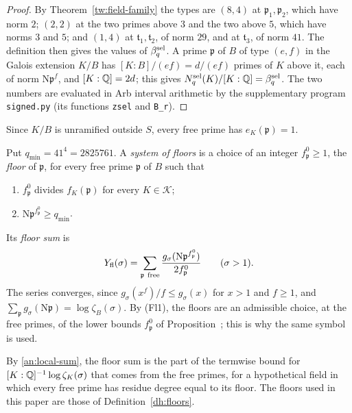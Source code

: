 \begin{proof}
By Theorem~\ref{tw:field-family} the types are $(8,4)$ at
$\mathfrak p_1,\mathfrak p_2$, which have norm $2$; $(2,2)$ at the two primes
above $3$ and the two above $5$, which have norms $3$ and $5$; and $(1,4)$ at
$\mathfrak t_1,\mathfrak t_2$, of norm $29$, and at $\mathfrak t_3$, of norm
$41$. The definition then gives the values of $\beta^{\rm sel}_q$. A prime
$\mathfrak p$ of $B$ of type $(e,f)$ in the Galois extension $K/B$ has
$[K:B]/(ef)=d/(ef)$ primes of $K$ above it, each of norm
$\mathrm N\mathfrak p^f$, and $[K:\mathbb Q]=2d$; this gives
$N^{\rm sel}_q(K)/[K:\mathbb Q]=\beta^{\rm sel}_q$. The two numbers are evaluated
in Arb interval arithmetic by the supplementary program \texttt{signed.py}
(its functions \texttt{zsel} and \texttt{B\_r}).
\end{proof}

Since $K/B$ is unramified outside $S$, every free prime has $e_K(\mathfrak
p)=1$.

\begin{definition}\label{an:floor-def}
Put $q_{\min}=41^4=2825761$. A \emph{system of floors} is a choice of an
integer $f^0_{\mathfrak p}\ge1$, the \emph{floor} of $\mathfrak p$, for every
free prime $\mathfrak p$ of $B$ such that
\begin{enumerate}
\item[(Fl1)] $f^0_{\mathfrak p}$ divides $f_K(\mathfrak p)$ for every
 $K\in\mathcal K$;
\item[(Fl2)] $\mathrm N\mathfrak p^{f^0_{\mathfrak p}}\ge q_{\min}$.
\end{enumerate}
Its \emph{floor sum} is
\[
 Y_{\rm fl}(\sigma)=\sum_{\mathfrak p\ \rm free}
 \frac{g_\sigma(\mathrm N\mathfrak p^{f^0_{\mathfrak p}})}{2f^0_{\mathfrak p}}
 \qquad(\sigma>1).
\]
The series converges, since $g_\sigma(x^f)/f\le g_\sigma(x)$ for $x>1$ and
$f\ge1$, and $\sum_{\mathfrak p}g_\sigma(\mathrm N\mathfrak p)=\log\zeta_B(\sigma)$.
By (Fl1), the floors are an admissible choice, at the free primes, of the lower
bounds $f^0_{\mathfrak p}$ of Proposition~; this is why
the same symbol is used.
\end{definition}

By \eqref{an:local-sum}, the floor sum is the part of the termwise bound
for $[K:\mathbb Q]^{-1}\log\zeta_K(\sigma)$ that comes from the free primes, for a
hypothetical field in which every free prime has residue degree equal to
its floor. The floors used in this paper are those of
Definition~\ref{dh:floors}.

